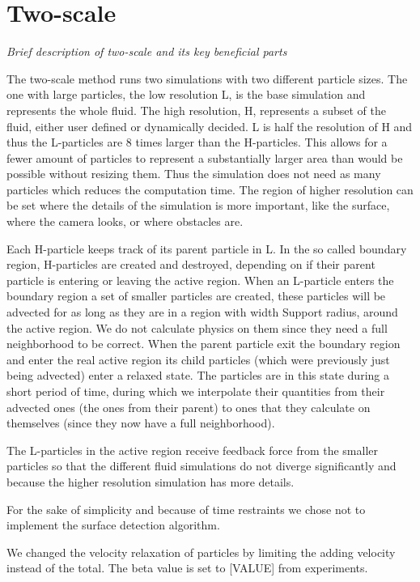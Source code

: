 \documentclass[../../main.tex]{subfiles}
\begin{document}


\section{Two-scale}
\textit{Brief description of two-scale and its key beneficial parts}

The two-scale method runs two simulations with two different particle sizes. The one with large particles, the low resolution L, is the base simulation and represents the whole fluid. The high resolution, H, represents a subset of the fluid, either user defined or dynamically decided. L is half the resolution of H and thus the L-particles are 8 times larger than the H-particles. This allows for a fewer amount of particles to represent a substantially larger area than would be possible without resizing them. Thus the simulation does not need as many particles which reduces the computation time. The region of higher resolution can be set where the details of the simulation is more important, like the surface, where the camera looks, or where obstacles are. 

Each H-particle keeps track of its parent particle in L. In the so called boundary region, H-particles are created and destroyed, depending on if their parent particle is entering or leaving the active region. When an L-particle enters the boundary region a set of smaller particles are created, these particles will be advected for as long as they are in a region with width Support radius, around the active region. We do not calculate physics on them since they need a full neighborhood to be correct. When the parent particle exit the boundary region and enter the real active region its child particles (which were previously just being advected) enter a relaxed state. The particles are in this state during a short period of time, during which we interpolate their quantities from their advected ones (the ones from their parent) to ones that they calculate on themselves (since they now have a full neighborhood). 

The L-particles in the active region receive feedback force from the smaller particles so that the different fluid simulations do not diverge significantly and because the higher resolution simulation has more details. 

For the sake of simplicity and because of time restraints we chose not to implement the surface detection algorithm.

We changed the velocity relaxation of particles by limiting the adding velocity instead of the total. The beta value is set to [VALUE] from experiments. 
\end{document}
